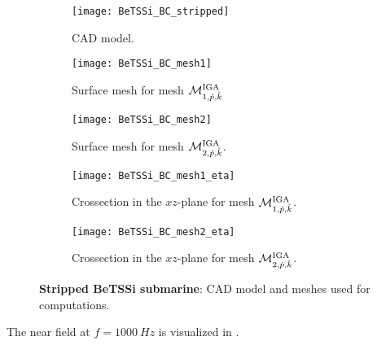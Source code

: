 \begin{figure}
	\begin{subfigure}{\textwidth}
		\centering
		\texttt{[image: BeTSSi\_BC\_stripped]}
		\caption{CAD model.}
		\label{Fig2:BC_stripped}
	\end{subfigure}
	\par\bigskip
	\par\bigskip
	\begin{subfigure}{\textwidth}
		\centering
		\texttt{[image: BeTSSi\_BC\_mesh1]}
		\caption{Surface mesh for mesh ${\cal M}_{1,\check{p},\check{k}}^{\mathrm{IGA}}$}
	\end{subfigure}	
	\par\bigskip
	\par\bigskip
	\begin{subfigure}{\textwidth}
		\centering
		\texttt{[image: BeTSSi\_BC\_mesh2]}
		\caption{Surface mesh for mesh ${\cal M}_{2,\check{p},\check{k}}^{\mathrm{IGA}}$.}
	\end{subfigure}	
	\par\bigskip
	\par\bigskip
	\begin{subfigure}{\textwidth}
		\centering
		\texttt{[image: BeTSSi\_BC\_mesh1\_eta]}
		\caption{Crossection in the $xz$-plane for mesh ${\cal M}_{1,\check{p},\check{k}}^{\mathrm{IGA}}$.}
	\end{subfigure}	
	\par\bigskip
	\par\bigskip
	\begin{subfigure}{\textwidth}
		\centering
		\texttt{[image: BeTSSi\_BC\_mesh2\_eta]}
		\caption{Crossection in the $xz$-plane for mesh ${\cal M}_{2,\check{p},\check{k}}^{\mathrm{IGA}}$.}
	\end{subfigure}	
	\caption{\textbf{Stripped BeTSSi submarine}: CAD model and meshes used for computations.}
	\label{Fig2:BC_strippedAndMesh}
\end{figure}
The near field at $f=\SI{1000}{Hz}$ is visualized in .

